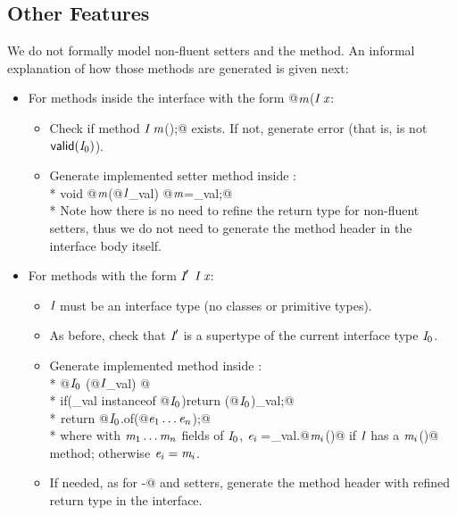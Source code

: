 \subsection{Other Features}

We do not formally model non-fluent setters and the \Q@with@ method.
An informal explanation of how those methods are generated is given next:
\begin{itemize}
\item For methods inside the interface with the form \Q@void @$\textit{m}$\QM($\C\ \x$\QM{);}:
  \begin{itemize}
    \item Check if method $\textit{I}\ \textit{m}$\Q@();@ exists. If not, generate error (that is, is not $\textsf{valid}(\textit{I}_0)$).
    \item Generate implemented setter method inside \Q@of@:\\*
           \Q@public void @$\textit{m}$\Q@(@$\textit{I}$\Q@ _val) { @$\textit{m}$\Q@=_val;}@\\*
    Note how there is no need to refine the return type for non-fluent setters, thus we do not need to generate the method header in the interface body itself.
    \end{itemize}
\item For methods with the form $\C'\ $$\C\ \x$\QM{);}:
  \begin{itemize}
   \item $\textit{I}$ must be an interface type (no classes or primitive types).
    \item As before, check that $\textit{I}'$ is a supertype of the current interface type $\textit{I}_0$.
    \item Generate implemented \Q@with@ method inside \Q@of@:\\*
           \Q@public @$\textit{I}_0\ $\Q@with(@$\textit{I}$\Q@ _val) { @\\*
           \Q@  if(_val instanceof @$\textit{I}_0$\Q@){return (@$\textit{I}_0$\Q@)_val;}@\\*
${}_{}$\Q@  return @$\textit{I}_0$\Q@.of(@$\textit{e}_1\ldots\textit{e}_n$\Q@);}@\\*
where with $\textit{m}_1\ldots\textit{m}_n$  fields of $\textit{I}_0$,
$\textit{e}_i=$\Q@_val.@$\textit{m}_i$\Q@()@ if $\textit{I}$ has a $\textit{m}_i$\Q@()@ method; otherwise
$\textit{e}_i=\textit{m}_i$.
    \item If needed, as for \Q@with-@ and setters, generate the method header with refined return type in the interface.
 \end{itemize}

\end{itemize}
